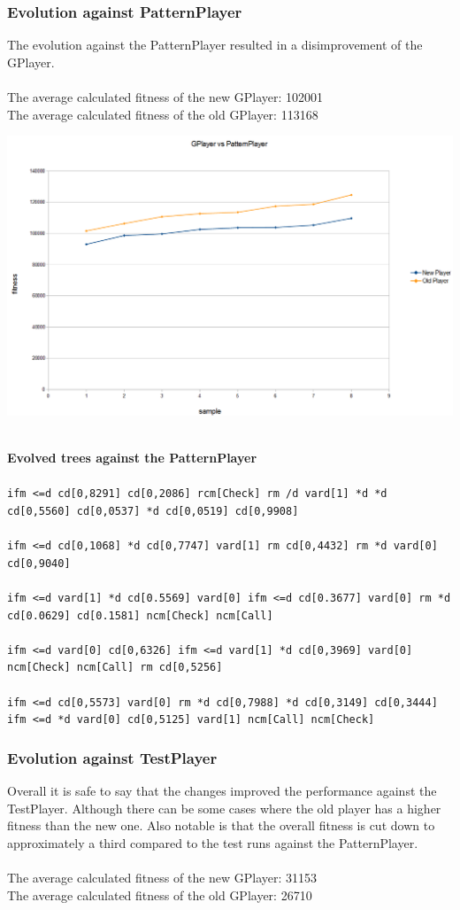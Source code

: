 \documentclass[12pt,fleqn,a4paper]{article}
\begin{document}
\subsubsection{Evolution against PatternPlayer}
The evolution against the PatternPlayer resulted in a disimprovement of the GPlayer.  \\ \\
The average calculated fitness of the new GPlayer: 102001\\
The average calculated fitness of the old GPlayer: 113168
\begin{center}
	\includegraphics[width=.9\textwidth]{gp_vs_pp_1.png}
\end{center}
\\
\textbf{Evolved trees against the PatternPlayer}\\ \\
\texttt{ifm <=d cd[0,8291] cd[0,2086] rcm[Check] rm /d vard[1] *d *d cd[0,5560] cd[0,0537] *d cd[0,0519] cd[0,9908]} \\ \\
\texttt{ifm <=d cd[0,1068] *d cd[0,7747] vard[1] rm cd[0,4432] rm *d vard[0] cd[0,9040]}\\ \\
\texttt{ifm <=d vard[1] *d cd[0.5569] vard[0] ifm <=d cd[0.3677] vard[0] rm *d cd[0.0629] cd[0.1581] ncm[Check] ncm[Call]}\\ \\
\texttt{ifm <=d vard[0] cd[0,6326] ifm <=d vard[1] *d cd[0,3969] vard[0] ncm[Check] ncm[Call] rm cd[0,5256]}\\ \\
\texttt{ifm <=d cd[0,5573] vard[0] rm *d cd[0,7988] *d cd[0,3149] cd[0,3444] ifm <=d *d vard[0] cd[0,5125] vard[1] ncm[Call] ncm[Check]}

\subsubsection{Evolution against TestPlayer}
Overall it is safe to say that the changes improved the performance against the TestPlayer. Although there can be some cases where the old player has a higher fitness than the new one. Also notable is that the overall fitness is cut down to approximately a third compared to the test runs against the PatternPlayer. \\ \\
The average calculated fitness of the new GPlayer: 31153\\
The average calculated fitness of the old GPlayer: 26710
\end{document}
